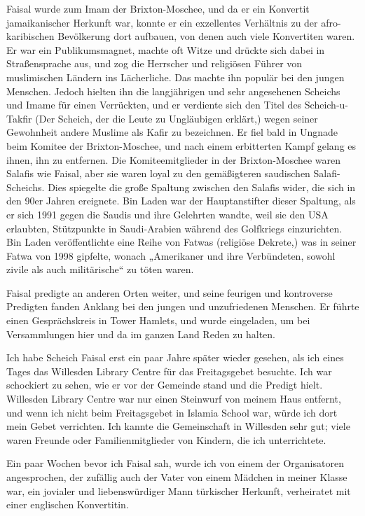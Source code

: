 \documentclass[12pt]{memoir}
\def\–{\hskip0pt-\hskip0pt}
\begin{document}
Faisal wurde zum Imam der Brixton\–Moschee,
und da er ein Konvertit jamaikanischer Herkunft war,
konnte er ein exzellentes Verhältnis
zu der afro\–karibischen Bevölkerung dort aufbauen,
von denen auch viele Konvertiten waren.
Er war ein Publikumsmagnet,
machte oft Witze und drückte sich dabei in Straßensprache aus,
und zog die Herrscher und religiösen Führer
von muslimischen Ländern ins Lächerliche.
Das machte ihn populär bei den jungen Menschen.
Jedoch hielten ihn die langjährigen und sehr angesehenen Scheichs und Imame
für einen Verrückten, und er verdiente sich den Titel des Scheich-u-Takfir
(Der Scheich, der die Leute zu Ungläubigen erklärt,)
wegen seiner Gewohnheit andere Muslime als Kafir zu bezeichnen.
Er fiel bald in Ungnade beim Komitee der Brixton\–Moschee,
und nach einem erbitterten Kampf gelang es ihnen, ihn zu entfernen.
Die Komiteemitglieder in der Brixton\–Moschee waren Salafis wie Faisal,
aber sie waren loyal zu den gemäßigteren saudischen Salafi\–Scheichs.
Dies spiegelte die große Spaltung zwischen den Salafis wider,
die sich in den 90er Jahren ereignete.
Bin Laden war der Hauptanstifter dieser Spaltung,
als er sich 1991 gegen die Saudis und ihre Gelehrten wandte,
weil sie den USA erlaubten,
Stützpunkte in Saudi\–Arabien während des Golfkriegs einzurichten.
Bin Laden veröffentlichte eine Reihe von Fatwas (religiöse Dekrete,)
was in seiner Fatwa von 1998 gipfelte,
wonach „Amerikaner und ihre Verbündeten,
sowohl zivile als auch militärische“ zu töten waren.

Faisal predigte an anderen Orten weiter,
und seine feurigen und kontroverse Predigten fanden Anklang
bei den jungen und unzufriedenen Menschen.
Er führte einen Gesprächskreis in Tower Hamlets, und wurde eingeladen,
um bei Versammlungen hier und da im ganzen Land Reden zu halten.

Ich habe Scheich Faisal erst ein paar Jahre später wieder gesehen,
als ich eines Tages das Willesden Library Centre
für das Freitagsgebet besuchte.
Ich war schockiert zu sehen, wie er vor der Gemeinde stand
und die Predigt hielt.
Willesden Library Centre war nur einen Steinwurf von meinem Haus entfernt,
und wenn ich nicht beim Freitagsgebet in Islamia School war,
würde ich dort mein Gebet verrichten.
Ich kannte die Gemeinschaft in Willesden sehr gut;
viele waren Freunde oder Familienmitglieder von Kindern,
die ich unterrichtete.

Ein paar Wochen bevor ich Faisal sah,
wurde ich von einem der Organisatoren angesprochen,
der zufällig auch der Vater von einem Mädchen in meiner Klasse war,
ein jovialer und liebenswürdiger Mann türkischer Herkunft,
verheiratet mit einer englischen Konvertitin.
\end{document}
